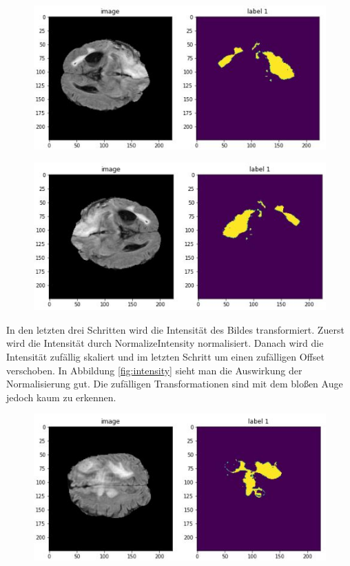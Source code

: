 \begin{figure}[H]
\includegraphics[width=\linewidth]{./images/flipAxis0.jpg}
\label{fig:flip1}

\includegraphics[width=\linewidth]{./images/flipAxis1.jpg}
\label{fig:flip2}
\end{figure}

In den letzten drei Schritten wird die Intensität des Bildes transformiert. Zuerst wird die Intensität durch NormalizeIntensity normalisiert. Danach wird die Intensität zufällig skaliert und im letzten Schritt um einen zufälligen Offset verschoben. In Abbildung \ref{fig:intensity} sieht man die Auswirkung der Normalisierung gut. Die zufälligen Transformationen sind mit dem bloßen Auge jedoch kaum zu erkennen.

\begin{figure}[H]
\includegraphics[width=\linewidth]{./images/flipAxis2.jpg}
\label{fig:flip3}
\end{figure}

